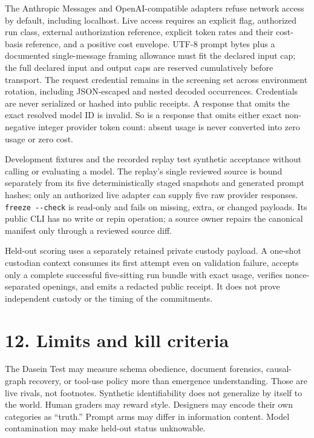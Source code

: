 \documentclass[
  english,
]{article}
\begin{document}
The Anthropic Messages and OpenAI-compatible adapters refuse network
access by default, including localhost. Live access requires an explicit
flag, authorized run class, external authorization reference, explicit
token rates and their cost-basis reference, and a positive cost
envelope. UTF-8 prompt bytes plus a documented single-message framing
allowance must fit the declared input cap; the full declared input and
output caps are reserved cumulatively before transport. The request
credential remains in the screening set across environment rotation,
including JSON-escaped and nested decoded occurrences. Credentials are
never serialized or hashed into public receipts. A response that omits
the exact resolved model ID is invalid. So is a response that omits
either exact non-negative integer provider token count: absent usage is
never converted into zero usage or zero cost.

Development fixtures and the recorded replay test synthetic acceptance
without calling or evaluating a model. The replay's single reviewed
source is bound separately from its five deterministically staged
snapshots and generated prompt hashes; only an authorized live adapter
can supply five raw provider responses. \texttt{freeze\ -\/-check} is
read-only and fails on missing, extra, or changed payloads. Its public
CLI has no write or repin operation; a source owner repairs the
canonical manifest only through a reviewed source diff.

Held-out scoring uses a separately retained private custody payload. A
one-shot custodian context consumes its first attempt even on validation
failure, accepts only a complete successful five-sitting run bundle with
exact usage, verifies nonce-separated openings, and emits a redacted
public receipt. It does not prove independent custody or the timing of
the commitments.

\section{12. Limits and kill criteria}\label{limits-and-kill-criteria}

The Dasein Test may measure schema obedience, document forensics,
causal-graph recovery, or tool-use policy more than emergence
understanding. Those are live rivals, not footnotes. Synthetic
identifiability does not generalize by itself to the world. Human
graders may reward style. Designers may encode their own categories as
``truth.'' Prompt arms may differ in information content. Model
contamination may make held-out status unknowable.
\end{document}
